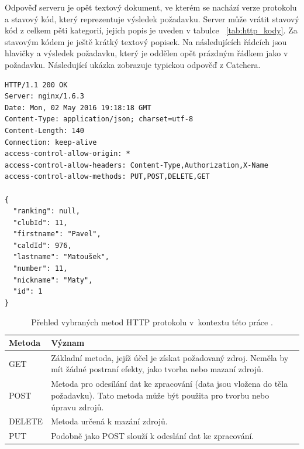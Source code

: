 \medskip


Odpověď serveru je opět textový dokument, ve kterém se nachází verze protokolu a stavový kód,
který reprezentuje výsledek požadavku. Server může vrátit stavový kód z celkem pěti kategorií,
jejich popis je uveden v tabulce ~\ref{tab:http_kody}. Za stavovým kódem je ještě krátký textový popisek. Na následujících
řádcích jsou hlavičky a výsledek požadavku, který je oddělen opět prázdným řádkem jako v požadavku.
Následující ukázka zobrazuje typickou odpověď z Catchera. 

\begingroup
\fontsize{9.5pt}{11pt}\selectfont
\begin{verbatim}
HTTP/1.1 200 OK
Server: nginx/1.6.3
Date: Mon, 02 May 2016 19:18:18 GMT
Content-Type: application/json; charset=utf-8
Content-Length: 140
Connection: keep-alive
access-control-allow-origin: *
access-control-allow-headers: Content-Type,Authorization,X-Name
access-control-allow-methods: PUT,POST,DELETE,GET

{
  "ranking": null,
  "clubId": 11,
  "firstname": "Pavel",
  "caldId": 976,
  "lastname": "Matoušek",
  "number": 11,
  "nickname": "Maty",
  "id": 1
}
\end{verbatim}
\endgroup

\begin{table}[]
\centering
\begin{tabular}{lp{9.5cm}}
\textbf{Metoda} & \textbf{Význam}\\
\midrule
GET & Základní metoda, jejíž účel je získat požadovaný zdroj. Neměla by mít žádné postraní efekty, jako tvorba nebo mazaní zdrojů.\\
\midrule
POST & Metoda pro odesílání dat ke zpracování (data jsou vložena do těla požadavku). Tato metoda může být použita pro tvorbu nebo úpravu zdrojů.\\
\midrule
DELETE & Metoda určená k mazání zdrojů.\\
\midrule
PUT & Podobně jako POST slouží k odeslání dat ke zpracování.\\
\midrule
\end{tabular}
\caption{Přehled vybraných metod HTTP protokolu v~kontextu této práce \cite{http_metody}.}
\label{tab:http_metody}
\end{table}

